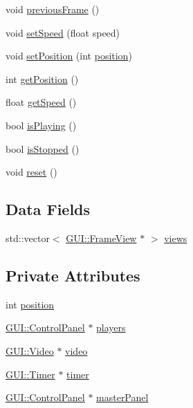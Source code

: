 \begin{DoxyCompactItemize}
void \hyperlink{classGUI_1_1VideoPlayer_a3c96ed37c70ebc0b32c527a04e1536d1}{previous\+Frame} ()
\item 
void \hyperlink{classGUI_1_1VideoPlayer_a5466c67c5ec22359c0702dc4ac8ffb19}{set\+Speed} (float speed)
\item 
void \hyperlink{classGUI_1_1VideoPlayer_a1aa68f77243229daea38d59bc5145d35}{set\+Position} (int \hyperlink{classGUI_1_1VideoPlayer_a401e942526aac47cef94f478182486e7}{position})
\item 
int \hyperlink{classGUI_1_1VideoPlayer_a97825791568ee242ca19d25b75030d87}{get\+Position} ()
\item 
float \hyperlink{classGUI_1_1VideoPlayer_a26ebefde7fe71954e6c1282255951b7d}{get\+Speed} ()
\item 
bool \hyperlink{classGUI_1_1VideoPlayer_a8438e3403946accc1986a05b89ee7b03}{is\+Playing} ()
\item 
bool \hyperlink{classGUI_1_1VideoPlayer_a2fc5ff4f369aaa46c55c3ad3c63216d6}{is\+Stopped} ()
\item 
void \hyperlink{classGUI_1_1VideoPlayer_ad20897c5c8bd47f5d4005989bead0e55}{reset} ()
\end{DoxyCompactItemize}
\subsection*{Data Fields}
\begin{DoxyCompactItemize}
\item 
std\+::vector$<$ \hyperlink{classGUI_1_1FrameView}{G\+U\+I\+::\+Frame\+View} $\ast$ $>$ \hyperlink{classGUI_1_1VideoPlayer_a386ea7404315a2845c3a410e22015a10}{views}
\end{DoxyCompactItemize}
\subsection*{Private Attributes}
\begin{DoxyCompactItemize}
\item 
int \hyperlink{classGUI_1_1VideoPlayer_a401e942526aac47cef94f478182486e7}{position}
\item 
\hyperlink{classGUI_1_1ControlPanel}{G\+U\+I\+::\+Control\+Panel} $\ast$ \hyperlink{classGUI_1_1VideoPlayer_a068c1591fd22d057fcaf36617c45d557}{players}
\item 
\hyperlink{classGUI_1_1Video}{G\+U\+I\+::\+Video} $\ast$ \hyperlink{classGUI_1_1VideoPlayer_a1c4d4daa00ecea5e8390244e057da0df}{video}
\item 
\hyperlink{classGUI_1_1Timer}{G\+U\+I\+::\+Timer} $\ast$ \hyperlink{classGUI_1_1VideoPlayer_a1653286e46cb3cc5ac65fd1d09d2a113}{timer}
\item 
\hyperlink{classGUI_1_1ControlPanel}{G\+U\+I\+::\+Control\+Panel} $\ast$ \hyperlink{classGUI_1_1VideoPlayer_aa54b9905c0af300064ca288140f1a7ba}{master\+Panel}
\end{DoxyCompactItemize}


